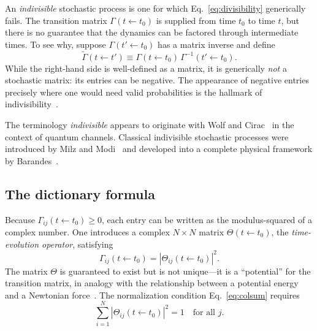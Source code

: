 \documentclass[aps,prd,twocolumn,superscriptaddress,nofootinbib]{revtex4-2}
\begin{document}
An \emph{indivisible} stochastic process is one for which Eq.~\eqref{eq:divisibility} generically fails. The transition matrix $\Gamma(t \leftarrow t_0)$ is supplied from time $t_0$ to time $t$, but there is no guarantee that the dynamics can be factored through intermediate times. To see why, suppose $\Gamma(t' \leftarrow t_0)$ has a matrix inverse and define
\begin{equation}
\tilde{\Gamma}(t \leftarrow t') \equiv \Gamma(t \leftarrow t_0)\, \Gamma^{-1}(t' \leftarrow t_0).
\label{eq:attempted_division}
\end{equation}
While the right-hand side is well-defined as a matrix, it is generically \emph{not} a stochastic matrix: its entries can be negative. The appearance of negative entries precisely where one would need valid probabilities is the hallmark of indivisibility~\cite{WolfCirac2008,MilzModi2021,Barandes2025SQC}.

The terminology \emph{indivisible} appears to originate with Wolf and Cirac~\cite{WolfCirac2008} in the context of quantum channels. Classical indivisible stochastic processes were introduced by Milz and Modi~\cite{MilzModi2021} and developed into a complete physical framework by Barandes~\cite{Barandes2025SQC,Barandes2025SQT}.

\subsection{The dictionary formula}

Because $\Gamma_{ij}(t \leftarrow t_0) \geq 0$, each entry can be written as the modulus-squared of a complex number. One introduces a complex $N \times N$ matrix $\Theta(t \leftarrow t_0)$, the \emph{time-evolution operator}, satisfying
\begin{equation}
\Gamma_{ij}(t \leftarrow t_0) = |\Theta_{ij}(t \leftarrow t_0)|^2.
\label{eq:dictionary_basic}
\end{equation}
The matrix $\Theta$ is guaranteed to exist but is not unique---it is a ``potential'' for the transition matrix, in analogy with the relationship between a potential energy and a Newtonian force~\cite{Barandes2025SQC}. The normalization condition Eq.~\eqref{eq:colsum} requires
\begin{equation}
\sum_{i=1}^{N} |\Theta_{ij}(t \leftarrow t_0)|^2 = 1 \quad \text{for all } j.
\label{eq:theta_norm}
\end{equation}
\end{document}
